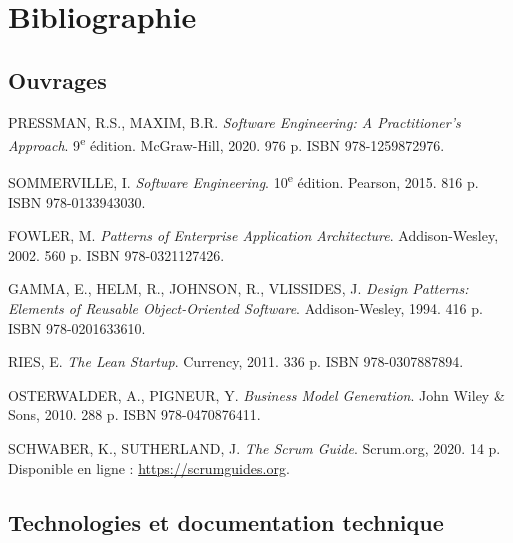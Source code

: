 \chapter*{Bibliographie}

\section*{Ouvrages}

\begin{enumerate}[label={[\arabic*]}]

\item PRESSMAN, R.S., MAXIM, B.R. \textit{Software Engineering: A Practitioner's Approach}. 9\textsuperscript{e} édition. McGraw-Hill, 2020. 976 p. ISBN 978-1259872976.

\item SOMMERVILLE, I. \textit{Software Engineering}. 10\textsuperscript{e} édition. Pearson, 2015. 816 p. ISBN 978-0133943030.

\item FOWLER, M. \textit{Patterns of Enterprise Application Architecture}. Addison-Wesley, 2002. 560 p. ISBN 978-0321127426.

\item GAMMA, E., HELM, R., JOHNSON, R., VLISSIDES, J. \textit{Design Patterns: Elements of Reusable Object-Oriented Software}. Addison-Wesley, 1994. 416 p. ISBN 978-0201633610.

\item RIES, E. \textit{The Lean Startup}. Currency, 2011. 336 p. ISBN 978-0307887894.

\item OSTERWALDER, A., PIGNEUR, Y. \textit{Business Model Generation}. John Wiley \& Sons, 2010. 288 p. ISBN 978-0470876411.

\item SCHWABER, K., SUTHERLAND, J. \textit{The Scrum Guide}. Scrum.org, 2020. 14 p. Disponible en ligne : \url{https://scrumguides.org}.

\end{enumerate}

\section*{Technologies et documentation technique}

